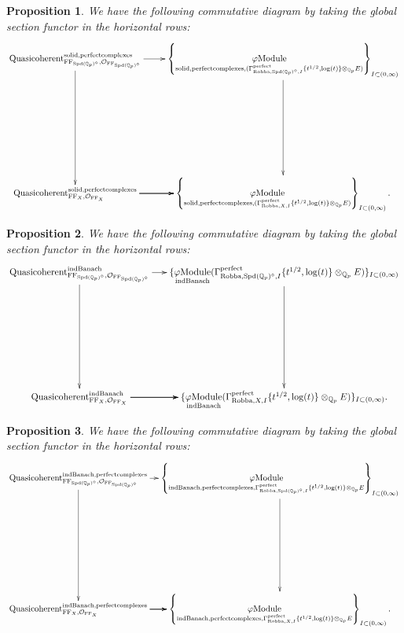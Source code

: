 \documentclass[12pt]{book}
\newtheorem{proposition}{Proposition}
\theoremstyle{definition}
\begin{document}
\begin{proposition}
We have the following commutative diagram by taking the global section functor in the horizontal rows:
\[\displayindent=+0in
\xymatrix@R+7pc{
\mathrm{Quasicoherent}^{\mathrm{solid,perfectcomplexes}}_{\mathrm{FF}_{\mathrm{Spd}(\mathbb{Q}_p)^\diamond},\mathcal{O}_{\mathrm{FF}_{\mathrm{Spd}(\mathbb{Q}_p)^\diamond}}} \ar[r] \ar[d] &\left\{\underset{\mathrm{solid,perfectcomplexes},(\Gamma^\text{perfect}_{\text{Robba},\mathrm{Spd}(\mathbb{Q}_p)^\diamond,I}\{t^{1/2},\log(t)\}\otimes_{\mathbb{Q}_p}E)}{\varphi\mathrm{Module}}\right\}_{I\subset (0,\infty)} \ar[d]  \\
\mathrm{Quasicoherent}^{\mathrm{solid,perfectcomplexes}}_{\mathrm{FF}_X,\mathcal{O}_{\mathrm{FF}_X}}  \ar[r] \ar[r] \ar[r] &\left\{\underset{\mathrm{solid,perfectcomplexes},(\Gamma^\text{perfect}_{\text{Robba},X,I}\{t^{1/2},\log(t)\}\otimes_{\mathbb{Q}_p}E)}{\varphi\mathrm{Module}}\right\}_{I\subset (0,\infty)}.   
}
\]
\end{proposition}

\begin{proposition}
We have the following commutative diagram by taking the global section functor in the horizontal rows:
\[\displayindent=+0in
\xymatrix@C-0.12in@R+7pc{
\mathrm{Quasicoherent}^{\mathrm{indBanach}}_{\mathrm{FF}_{\mathrm{Spd}(\mathbb{Q}_p)^\diamond},\mathcal{O}_{\mathrm{FF}_{\mathrm{Spd}(\mathbb{Q}_p)^\diamond}}} \ar[r] \ar[d] &\{\underset{\mathrm{indBanach}}{\varphi\mathrm{Module}}(\Gamma^\text{perfect}_{\text{Robba},\mathrm{Spd}(\mathbb{Q}_p)^\diamond,I}\{t^{1/2},\log(t)\}\otimes_{\mathbb{Q}_p}E)\}_{I\subset (0,\infty)}\ar[d]\\
\mathrm{Quasicoherent}^{\mathrm{indBanach}}_{\mathrm{FF}_X,\mathcal{O}_{\mathrm{FF}_X}}  \ar[r] \ar[r] \ar[r] &\{\underset{\mathrm{indBanach}}{\varphi\mathrm{Module}}(\Gamma^\text{perfect}_{\text{Robba},X,I}\{t^{1/2},\log(t)\}\otimes_{\mathbb{Q}_p}E)\}_{I\subset (0,\infty)}.    
}
\]
\end{proposition}

\begin{proposition}
We have the following commutative diagram by taking the global section functor in the horizontal rows:
\[\displayindent=+0in
\xymatrix@C-0.2in@R+7pc{
\mathrm{Quasicoherent}^{\mathrm{indBanach,perfectcomplexes}}_{\mathrm{FF}_{\mathrm{Spd}(\mathbb{Q}_p)^\diamond},\mathcal{O}_{\mathrm{FF}_{\mathrm{Spd}(\mathbb{Q}_p)^\diamond}}} \ar[d]\ar[r] &\left\{\underset{\mathrm{indBanach,perfectcomplexes},\Gamma^\text{perfect}_{\text{Robba},\mathrm{Spd}(\mathbb{Q}_p)^\diamond,I}\{t^{1/2},\log(t)\}\otimes_{\mathbb{Q}_p}E}{\varphi\mathrm{Module}}\right\}_{I\subset (0,\infty)}\ar[d]\\
\mathrm{Quasicoherent}^{\mathrm{indBanach,perfectcomplexes}}_{\mathrm{FF}_X,\mathcal{O}_{\mathrm{FF}_X}}  \ar[r] \ar[r] \ar[r] &\left\{\underset{\mathrm{indBanach,perfectcomplexes},\Gamma^\text{perfect}_{\text{Robba},X,I}\{t^{1/2},\log(t)\}\otimes_{\mathbb{Q}_p}E}{\varphi\mathrm{Module}}\right\}_{I\subset (0,\infty)}.    
}
\]

\end{proposition}
\end{document}

